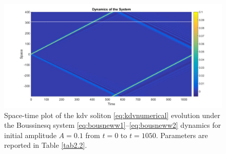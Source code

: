 \documentclass[alpha-refs, 12pt]{wiley-article}
\begin{document}
\begin{figure}
  \centering
  \includegraphics[width=0.95\linewidth]{figs/numerique_bouss.jpg}
  \caption{Space-time plot of the \acrshort{kdv} soliton \eqref{eq:kdvnumerical} evolution under the Boussinesq system \eqref{eq:bousneww1}--\eqref{eq:bousneww2} dynamics for initial amplitude $A = 0.1$ from $t = 0$ to $t = 1050$. Parameters are reported in Table \ref{tab2.2}.}
  \label{fig:3.6}
\end{figure}
\end{document}
